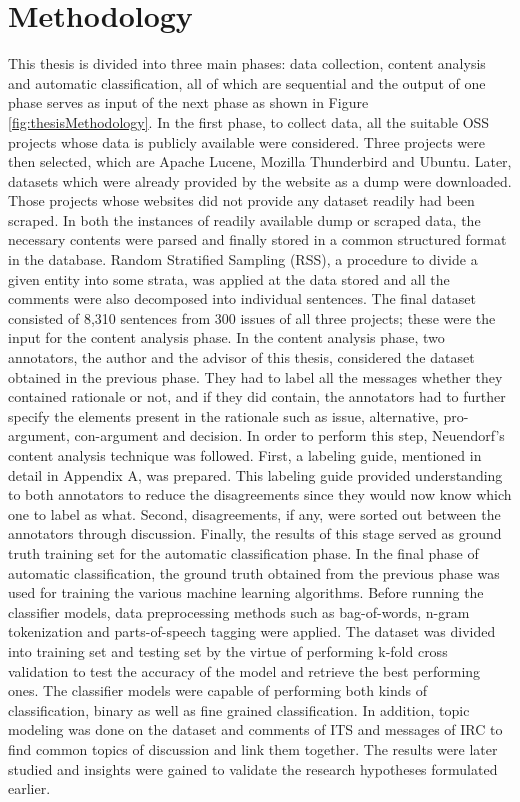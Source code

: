 \documentclass[a4paper,12pt,twoside]{report}
\begin{document}
\section{Methodology}
This thesis is divided into three main phases: data collection, content analysis and automatic classification, all of which are sequential and the output of one phase serves as input of the next phase as shown in Figure \ref{fig:thesisMethodology}. In the first phase, to collect data, all the suitable OSS projects whose data is publicly available were considered. Three projects were then selected, which are Apache Lucene, Mozilla Thunderbird and Ubuntu. Later, datasets which were already provided by the website as a dump were downloaded. Those projects whose websites did not provide any dataset readily had been scraped. In both the instances of readily available dump or scraped data, the necessary contents were parsed and finally stored in a common structured format in the database. Random Stratified Sampling (RSS), a procedure to divide a given entity into some strata, was applied at the data stored and all the comments were also decomposed into individual sentences. The final dataset consisted of 8,310 sentences from 300 issues of all three projects; these were the input for the content analysis phase. 
\newline \newline
In the content analysis phase, two annotators, the author and the advisor of this thesis, considered the dataset obtained in the previous phase. They had to label all the messages whether they contained rationale or not, and if they did contain, the annotators had to further specify the elements present in the rationale such as issue, alternative, pro-argument, con-argument and decision. In order to perform this step, Neuendorf's \cite{Neuendorf2017a} content analysis technique was followed. First, a labeling guide, mentioned in detail in Appendix A, was prepared. This labeling guide provided understanding to both annotators to reduce the disagreements since they would now know which one to label as what. Second, disagreements, if any, were sorted out between the annotators through discussion. Finally, the results of this stage served as ground truth training set for the automatic classification phase.  
\newline \newline
In the final phase of automatic classification, the ground truth obtained from the previous phase was used for training the various machine learning algorithms. Before running the classifier models, data preprocessing methods such as bag-of-words, n-gram tokenization and parts-of-speech tagging were applied. The dataset was divided into training set and testing set by the virtue of performing k-fold cross validation to test the accuracy of the model and retrieve the best performing ones. The classifier models were capable of performing both kinds of classification, binary as well as fine grained classification. In addition, topic modeling was done on the dataset and comments of ITS and messages of IRC to find common topics of discussion and link them together. The results were later studied and insights were gained to validate the research hypotheses formulated earlier. 
\end{document}
